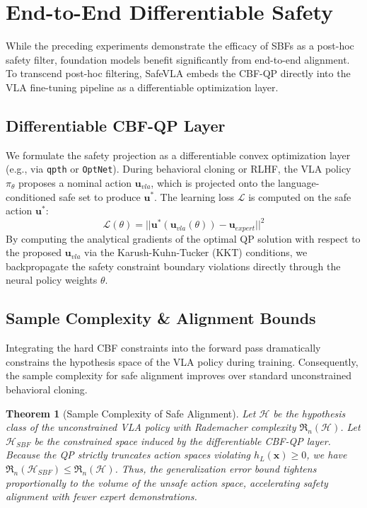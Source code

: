 \documentclass[conference]{IEEEtran}
\newtheorem{theorem}{Theorem}
\begin{document}
\section{End-to-End Differentiable Safety}
While the preceding experiments demonstrate the efficacy of SBFs as a post-hoc safety filter, foundation models benefit significantly from end-to-end alignment. To transcend post-hoc filtering, SafeVLA embeds the CBF-QP directly into the VLA fine-tuning pipeline as a differentiable optimization layer.

\subsection{Differentiable CBF-QP Layer}
We formulate the safety projection as a differentiable convex optimization layer (e.g., via \texttt{qpth} or \texttt{OptNet}). During behavioral cloning or RLHF, the VLA policy $\pi_\theta$ proposes a nominal action $\mathbf{u}_{vla}$, which is projected onto the language-conditioned safe set to produce $\mathbf{u}^*$. The learning loss $\mathcal{L}$ is computed on the safe action $\mathbf{u}^*$:
\begin{equation}
\mathcal{L}(\theta) = || \mathbf{u}^*(\mathbf{u}_{vla}(\theta)) - \mathbf{u}_{expert} ||^2
\end{equation}
By computing the analytical gradients of the optimal QP solution with respect to the proposed $\mathbf{u}_{vla}$ via the Karush-Kuhn-Tucker (KKT) conditions, we backpropagate the safety constraint boundary violations directly through the neural policy weights $\theta$.

\subsection{Sample Complexity \& Alignment Bounds}
Integrating the hard CBF constraints into the forward pass dramatically constrains the hypothesis space of the VLA policy during training. Consequently, the sample complexity for safe alignment improves over standard unconstrained behavioral cloning.

\begin{theorem}[Sample Complexity of Safe Alignment]
Let $\mathcal{H}$ be the hypothesis class of the unconstrained VLA policy with Rademacher complexity $\mathfrak{R}_n(\mathcal{H})$. Let $\mathcal{H}_{SBF}$ be the constrained space induced by the differentiable CBF-QP layer. Because the QP strictly truncates action spaces violating $h_L(\mathbf{x}) \ge 0$, we have $\mathfrak{R}_n(\mathcal{H}_{SBF}) \le \mathfrak{R}_n(\mathcal{H})$. Thus, the generalization error bound tightens proportionally to the volume of the unsafe action space, accelerating safety alignment with fewer expert demonstrations.
\end{theorem}
\end{document}

